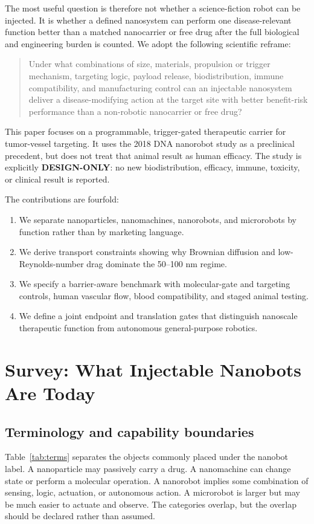 \documentclass[conference]{IEEEtran}
\begin{document}
The most useful question is therefore not whether a science-fiction robot can be injected. It is whether a defined nanosystem can perform one disease-relevant function better than a matched nanocarrier or free drug after the full biological and engineering burden is counted. We adopt the following scientific reframe:

\begin{quote}
Under what combinations of size, materials, propulsion or trigger mechanism, targeting logic, payload release, biodistribution, immune compatibility, and manufacturing control can an injectable nanosystem deliver a disease-modifying action at the target site with better benefit-risk performance than a non-robotic nanocarrier or free drug?
\end{quote}

This paper focuses on a programmable, trigger-gated therapeutic carrier for tumor-vessel targeting. It uses the 2018 DNA nanorobot study as a preclinical precedent, but does not treat that animal result as human efficacy. The study is explicitly \textbf{DESIGN-ONLY}: no new biodistribution, efficacy, immune, toxicity, or clinical result is reported.

The contributions are fourfold:
\begin{enumerate}
\item We separate nanoparticles, nanomachines, nanorobots, and microrobots by function rather than by marketing language.
\item We derive transport constraints showing why Brownian diffusion and low-Reynolds-number drag dominate the 50--100 nm regime.
\item We specify a barrier-aware benchmark with molecular-gate and targeting controls, human vascular flow, blood compatibility, and staged animal testing.
\item We define a joint endpoint and translation gates that distinguish nanoscale therapeutic function from autonomous general-purpose robotics.
\end{enumerate}

\section{Survey: What Injectable Nanobots Are Today}
\label{sec:survey}
\subsection{Terminology and capability boundaries}
Table~\ref{tab:terms} separates the objects commonly placed under the nanobot label. A nanoparticle may passively carry a drug. A nanomachine can change state or perform a molecular operation. A nanorobot implies some combination of sensing, logic, actuation, or autonomous action. A microrobot is larger but may be much easier to actuate and observe. The categories overlap, but the overlap should be declared rather than assumed.
\end{document}
